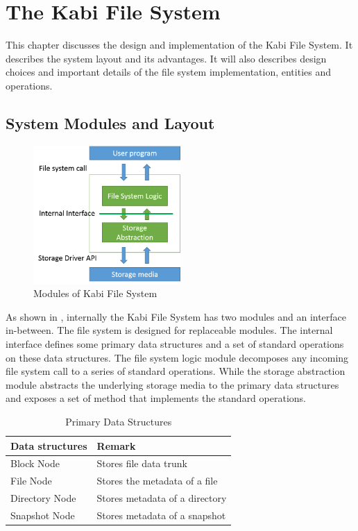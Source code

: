 \chapter{The Kabi File System}
\label{chap:fs}

    This chapter discusses the design and implementation of the Kabi File System. It describes the system layout and its advantages. It will also describes design choices and important details of the file system implementation, entities and operations.

\section{System Modules and Layout}

\begin{figure}[t]
\centering
\includegraphics[width=0.5\textwidth]{Chapter-3/figs/fig8.png}
\caption{Modules of Kabi File System}
\label{fig:modules}
\end{figure}

    As shown in , internally the Kabi File System has two modules and an interface in-between. The file system is designed for replaceable modules. The internal interface defines some primary data structures and a set of standard operations on these data structures. The file system logic module decomposes any incoming file system call to a series of standard operations.
	While the storage abstraction module abstracts the underlying storage media to the primary data structures and exposes a set of method that implements the standard operations.

\begin{table}[t]
\begin{center}
\begin{tabular}{ll}
\toprule
Data structures & Remark\\
\midrule
Block Node & Stores file data trunk\\
File Node & Stores the metadata of a file\\
Directory Node & Stores metadata of a directory \\
Snapshot Node & Stores metadata of a snapshot\\
\bottomrule
\end{tabular}
\end{center}
\caption{Primary Data Structures}
\label{tab:data_struct}
\end{table}

